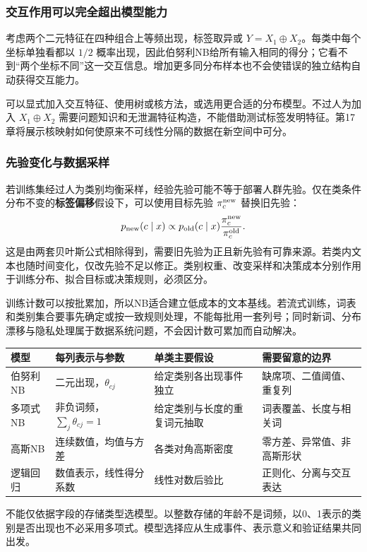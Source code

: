 \documentclass[UTF8,fontset=none,zihao=-4,a4paper]{ctexart}
\newcommand{\term}[1]{\textbf{#1}}
\numberwithin{equation}{section}
\numberwithin{figure}{section}
\begin{document}
\subsubsection{交互作用可以完全超出模型能力}
考虑两个二元特征在四种组合上等频出现，标签取异或 $Y=X_1\oplus X_2$。每类中每个坐标单独看都以 $1/2$ 概率出现，因此伯努利NB给所有输入相同的得分；它看不到“两个坐标不同”这一交互信息。增加更多同分布样本也不会使错误的独立结构自动获得交互能力。

可以显式加入交互特征、使用树或核方法，或选用更合适的分布模型。不过人为加入 $X_1\oplus X_2$ 需要问题知识和无泄漏特征构造，不能借助测试标签发明特征。第17章将展示核映射如何使原来不可线性分隔的数据在新空间中可分。

\subsubsection{先验变化与数据采样}
若训练集经过人为类别均衡采样，经验先验可能不等于部署人群先验。仅在类条件分布不变的\term{标签偏移}假设下，可以使用目标先验 $\pi_c^{\rm new}$ 替换旧先验：
\[
 p_{\rm new}(c\mid x)\propto
 p_{\rm old}(c\mid x)\frac{\pi_c^{\rm new}}{\pi_c^{\rm old}}.
\]
这是由两套贝叶斯公式相除得到，需要旧先验为正且新先验有可靠来源。若类内文本也随时间变化，仅改先验不足以修正。类别权重、改变采样和决策成本分别作用于训练分布、拟合目标或决策规则，必须区分。

训练计数可以按批累加，所以NB适合建立低成本的文本基线。若流式训练，词表和类别集合要事先确定或按一致规则处理，不能每批用一套列号；同时新词、分布漂移与隐私处理属于数据系统问题，不会因计数可累加而自动解决。

\begin{center}\small
\begin{tabularx}{\linewidth}{lYYY}\toprule
模型 & 每列表示与参数 & 单类主要假设 & 需要留意的边界\\\midrule
伯努利NB & 二元出现，$\theta_{cj}$ & 给定类别各出现事件独立 & 缺席项、二值阈值、重复列\\
多项式NB & 非负词频，$\sum_j\theta_{cj}=1$ & 给定类别与长度的重复词元抽取 & 词表覆盖、长度与相关词\\
高斯NB & 连续数值，均值与方差 & 各类对角高斯密度 & 零方差、异常值、非高斯形状\\
逻辑回归 & 数值表示，线性得分系数 & 线性对数后验比 & 正则化、分离与交互表达\\\bottomrule
\end{tabularx}\end{center}
不能仅依据字段的存储类型选模型。以整数存储的年龄不是词频，以0、1表示的类别是否出现也不必采用多项式。模型选择应从生成事件、表示意义和验证结果共同出发。
\end{document}
